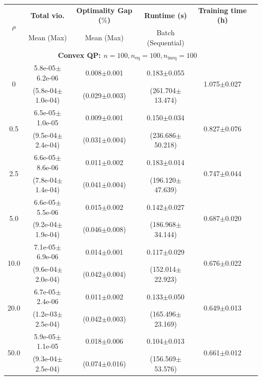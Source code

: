 \documentclass{article}
\newcommand{\thinrule}{\midrule[0.1pt]}
\newcommand{\std}[1]{{\tiny$\pm${#1}}}
\begin{document}
\begin{table}[h]
\centering
\scriptsize
\setlength{\tabcolsep}{5pt}
\begin{tabular}{cccccc}
\toprule
\multirow{2}{*}{\textbf{$\rho$}}
& \multicolumn{1}{c}{\textbf{Total vio.}}
& \multicolumn{1}{c}{\textbf{Optimality Gap ($\%$)}} 
& \multicolumn{1}{c}{\textbf{Runtime (s)}} 
& \multicolumn{1}{c}{\textbf{Training time (h)}} \\

& Mean (Max) 
& Mean (Max) 
& Batch (Sequential)\\
\midrule
\multicolumn{5}{c}{\textbf{Convex QP: \(n=100, n_{\mathrm{eq}}=100, n_{\mathrm{ineq}}=100\)}} \\
\midrule
\multirow{2}{*}{0} 
&5.8e-05\std{6.2e-06} 
& 0.008\std{0.001} 
& 0.183\std{0.055} 
& \multirow{2}{*}{1.075\std{0.027}}
\\ 
&(5.8e-04\std{1.0e-04}) 
& (0.029\std{0.003}) 
& (261.704\std{13.474}) & \\ 

\thinrule
\multirow{2}{*}{0.5} 
&6.5e-05\std{1.0e-05} 
& 0.009\std{0.001} 
& 0.150\std{0.034} 
& \multirow{2}{*}{0.827\std{0.076}}
\\ 
&(9.5e-04\std{2.4e-04}) 
& (0.031\std{0.004}) 
& (236.686\std{50.218}) & \\

\thinrule
\multirow{2}{*}{2.5} 
&6.6e-05\std{8.6e-06} 
& 0.011\std{0.002} 
& 0.183\std{0.014} 
& \multirow{2}{*}{0.747\std{0.044}}\\ 
&(7.8e-04\std{1.4e-04}) 
& (0.041\std{0.004}) 
& (196.120\std{47.639}) & \\

\thinrule
\multirow{2}{*}{5.0}
&6.6e-05\std{5.5e-06} 
& 0.015\std{0.002} 
& 0.142\std{0.027} 
& \multirow{2}{*}{0.687\std{0.020}}
\\ 
&(9.2e-04\std{1.9e-04}) 
& (0.046\std{0.008}) 
& (186.968\std{34.144}) & \\ 
\thinrule
\multirow{2}{*}{10.0}
&7.1e-05\std{6.9e-06} 
& 0.014\std{0.001} 
& 0.117\std{0.029} 
& \multirow{2}{*}{0.676\std{0.022}}
\\ 
&(9.6e-04\std{2.0e-04}) 
& (0.042\std{0.004}) 
& (152.014\std{22.923}) & \\

\thinrule
\multirow{2}{*}{20.0}
&6.7e-05\std{2.4e-06} 
& 0.011\std{0.002} 
& 0.133\std{0.050} 
& \multirow{2}{*}{0.649\std{0.013}}
\\ 
&(1.2e-03\std{2.5e-04}) 
& (0.042\std{0.003}) 
& (165.496\std{23.169}) & \\
\thinrule
\multirow{2}{*}{50.0}
&5.9e-05\std{1.1e-05} 
& 0.018\std{0.006} 
& 0.104\std{0.013} 
& \multirow{2}{*}{0.661\std{0.012}}
\\ 
&(9.3e-04\std{2.5e-04}) 
& (0.074\std{0.016}) 
& (156.569\std{53.576}) & \\ 


\end{tabular}
\end{table}
\end{document}
